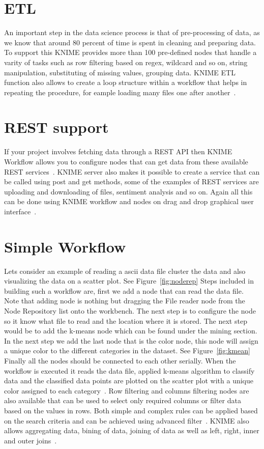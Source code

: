 \section{ETL}
An important step in the data science process is that of pre-processing of data,
as we know that around 80 percent of time is spent in cleaning and preparing
data. To support this KNIME provides more than 100 pre-defined nodes that handle
a varity of tasks such as row filtering based on regex, wildcard and so on,
string manipulation, substituting of missing values, grouping data.  KNIME ETL
function also allows to create a loop structure within a workflow that helps in
repeating the procedure, for eample loading many files one after
another~\cite{hid-sp18-517-etl}.

\section{REST support}

If your project involves fetching data through a REST API then KNIME Workflow
allows you to configure nodes that can get data from these available REST
services~\cite{hid-sp18-517-knimeapi}.  KNIME server also makes it possible to
create a service that can be called using post and get methods, some of the
examples of REST services are uploading and downloading of files, sentiment
analysis and so on. Again all this can be done using KNIME workflow and nodes on
drag and drop graphical user interface~\cite{hid-sp18-517-knimerest}.

\section{Simple Workflow}
Lets consider an example of reading a ascii data file cluster the data and also
visualizing the data on a scatter plot. See Figure~\ref{fig:noderep} Steps
included in building such a workflow are, first we add a node that can read the
data file.  Note that adding node is nothing but dragging the File reader node
from the Node Repository list onto the workbench. The next step is to configure
the node so it know what file to read and the location where it is stored.  The
next step would be to add the k-means node which can be found under the mining
section. In the next step we add the last node that is the color node, this node
will assign a unique color to the different categories in the dataset. See
Figure~\ref{fig:kmean} Finally all the nodes should be connected to each other
serially. When the workflow is executed it reads the data file, applied k-means
algorithm to classify data and the classified data points are plotted on the
scatter plot with a unique color assigned to each
category~\cite{hid-sp18-517-wf}.  Row filtering and columns filtering nodes are
also available that can be used to select only required columns or filter data
based on the values in rows. Both simple and complex rules can be applied based
on the search criteria and can be achieved using advanced
filter~\cite{hid-sp18-517-filters}.  KNIME also allows aggregating data, bining
of data, joining of data as well as left, right, inner and outer
joins~\cite{hid-sp18-517-join}.


